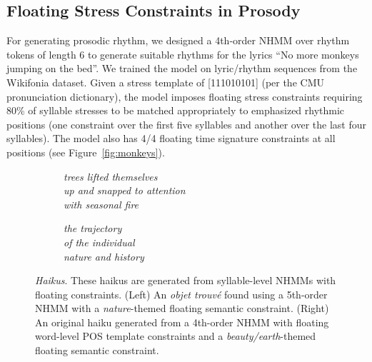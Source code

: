 \documentclass[phd,electronic,oneside,twosidetoc,letterpaper,chaptercenter,parttop,lof,lot]{byumsphd}
\begin{document}
\subsection{Floating Stress Constraints in Prosody}

For generating prosodic rhythm, we designed a 4th-order NHMM over rhythm tokens of length 6 to generate suitable rhythms for the lyrics ``No more monkeys jumping on the bed''. We trained the model on lyric/rhythm sequences from the Wikifonia dataset. Given a stress template of [111010101] (per the CMU pronunciation dictionary), the model imposes floating stress constraints requiring 80\% of syllable stresses to be matched appropriately to emphasized rhythmic positions (one constraint over the first five syllables and another over the last four syllables). The model also has 4/4 floating time signature constraints at all positions (see Figure~\ref{fig:monkeys}). 

\begin{figure}
\centering
\begin{subfigure}[b]{.5\linewidth}
\centering
\textit{trees lifted themselves \\
up and snapped to attention \\
with seasonal fire \\}
\end{subfigure}
\begin{subfigure}[b]{.45\linewidth}
\centering
\textit{the trajectory \\
of the individual \\ 
nature and history \\}
\end{subfigure}

\caption{\textit{Haikus}. These haikus are generated from syllable-level NHMMs with floating constraints. (Left) An \textit{objet trouv\'e} found using a 5th-order NHMM with a \textit{nature}-themed floating semantic constraint. (Right) An original haiku generated from a 4th-order NHMM with floating word-level POS template constraints and a \textit{beauty/earth}-themed floating semantic constraint.}
\label{fig:haiku}
\end{figure}
\end{document}
